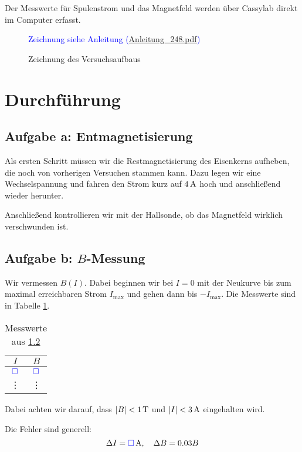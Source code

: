 \documentclass[11pt, ngerman]{article}
\newcommand{\messwert}{\textcolor{blue}{\square}}
\begin{document}
Der Messwerte für Spulenstrom und das Magnetfeld werden über Cassylab direkt im Computer erfasst.

\begin{figure}[h!]
	\centering
	\textcolor{blue}{Zeichnung siehe Anleitung (\url{Anleitung_248.pdf})}
	\caption{Zeichnung des Versuchsaufbaus}
\end{figure}

\section{Durchführung}

\subsection{Aufgabe a: Entmagnetisierung}

Als ersten Schritt müssen wir die Restmagnetisierung des Eisenkerns aufheben,
die noch von vorherigen Versuchen stammen kann. Dazu legen wir eine
Wechselspannung und fahren den Strom kurz auf $\unit[4]A$ hoch und anschließend
wieder herunter.

Anschließend kontrollieren wir mit der Hallsonde, ob das Magnetfeld wirklich
verschwunden ist.

\subsection{Aufgabe b: $B$-Messung}

\label{Durchführung-b}

Wir vermessen $B(I)$. Dabei beginnen wir bei $I = 0$ mit der Neukurve bis zum
maximal erreichbaren Strom $I_\text{max}$ und gehen dann bis $-I_\text{max}$.
Die Messwerte sind in Tabelle \ref{table:B(I)}.

\begin{table}[h!]
	\centering

	\begin{tabular}{cc}
		$I$ & $B$ \\
		\hline
		$\messwert$ & $\messwert$ \\
		\vdots & \vdots
	\end{tabular}

	\caption{Messwerte aus \ref{Durchführung-b}}
	\label{table:B(I)}
\end{table}

Dabei achten wir darauf, dass $|B| < \unit[1]T$ und $|I| < \unit[3]A$
eingehalten wird.

Die Fehler sind generell:
\[
	\Delta I = \unit[\messwert] A
	, \quad
	\Delta B = 0.03 B
\]
\end{document}
